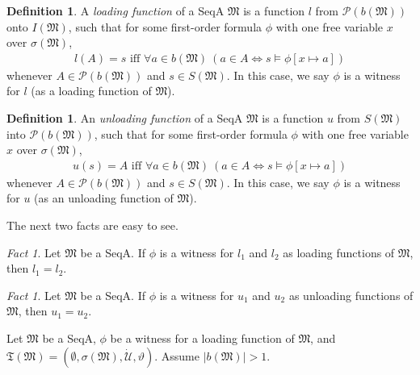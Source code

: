 \documentclass[12pt, twoside]{memoir}
\numberwithin{equation}{section}
\theoremstyle{definition}
\newtheorem{defi}[thm]{Definition}
\theoremstyle{remark}
\newtheorem{fact}[thm]{Fact}
\theoremstyle{definition}
\theoremstyle{definition}
\theoremstyle{definition}
\theoremstyle{remark}
\begin{document}
\begin{defi}
A \emph{loading function} of a SeqA $\mathfrak{M}$ is a function $l$ from $\mathcal{P}(b(\mathfrak{M}))$ onto $I(\mathfrak{M})$, such that for some first-order formula $\phi$ with one free variable $x$ over $\sigma(\mathfrak{M})$,
\begin{align*}
    l(A) = s \text{ iff } \forall a \in b(\mathfrak{M}) \ (a \in A \iff s \models \phi[x \mapsto a])
\end{align*}
whenever $A \in \mathcal{P}(b(\mathfrak{M}))$ and $s \in S(\mathfrak{M})$. In this case, we say $\phi$ is a witness for $l$ (as a loading function of $\mathfrak{M}$).
\end{defi}

\begin{defi}
An \emph{unloading function} of a SeqA $\mathfrak{M}$ is a function $u$ from $S(\mathfrak{M})$ into $\mathcal{P}(b(\mathfrak{M}))$, such that for some first-order formula $\phi$ with one free variable $x$ over $\sigma(\mathfrak{M})$,
\begin{align*}
    u(s) = A \text{ iff } \forall a \in b(\mathfrak{M}) \ (a \in A \iff s \models \phi[x \mapsto a])
\end{align*}
whenever $A \in \mathcal{P}(b(\mathfrak{M}))$ and $s \in S(\mathfrak{M})$. In this case, we say $\phi$ is a witness for $u$ (as an unloading function of $\mathfrak{M}$).
\end{defi}

The next two facts are easy to see.

\begin{fact}\label{fact215}
Let $\mathfrak{M}$ be a SeqA. If $\phi$ is a witness for $l_1$ and $l_2$ as loading functions of $\mathfrak{M}$, then $l_1 = l_2$.
\end{fact}

\begin{fact}\label{fact216}
Let $\mathfrak{M}$ be a SeqA. If $\phi$ is a witness for $u_1$ and $u_2$ as unloading functions of $\mathfrak{M}$, then $u_1 = u_2$.
\end{fact}

Let $\mathfrak{M}$ be a SeqA, $\phi$ be a witness for a loading function of $\mathfrak{M}$, and $\mathfrak{T}(\mathfrak{M}) = (\emptyset, \sigma(\mathfrak{M}), \dot{\mathcal{U}}, \vartheta)$. Assume $|b(\mathfrak{M})| > 1$. 
\end{document}
